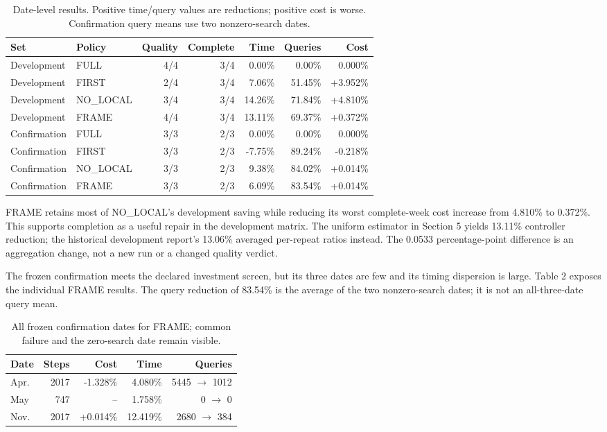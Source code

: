 \begin{table}[t]
\centering
\begin{tabular}{@{}llrrrrr@{}}
\toprule
Set & Policy & Quality & Complete & Time & Queries & Cost \\
\midrule
Development & FULL & 4/4 & 3/4 & 0.00\% & 0.00\% & 0.000\% \\
Development & FIRST & 2/4 & 3/4 & 7.06\% & 51.45\% & +3.952\% \\
Development & NO\_LOCAL & 3/4 & 3/4 & 14.26\% & 71.84\% & +4.810\% \\
Development & FRAME & 4/4 & 3/4 & 13.11\% & 69.37\% & +0.372\% \\
Confirmation & FULL & 3/3 & 2/3 & 0.00\% & 0.00\% & 0.000\% \\
Confirmation & FIRST & 3/3 & 2/3 & -7.75\% & 89.24\% & -0.218\% \\
Confirmation & NO\_LOCAL & 3/3 & 2/3 & 9.38\% & 84.02\% & +0.014\% \\
Confirmation & FRAME & 3/3 & 2/3 & 6.09\% & 83.54\% & +0.014\% \\
\bottomrule
\end{tabular}
\caption{Date-level results. Positive time/query values are reductions; positive cost is worse. Confirmation query means use two nonzero-search dates.}
\end{table}

FRAME retains most of NO\_LOCAL's development saving while reducing its worst complete-week cost increase from 4.810\% to 0.372\%. This supports completion as a useful repair in the development matrix. The uniform estimator in Section 5 yields 13.11\% controller reduction; the historical development report's 13.06\% averaged per-repeat ratios instead. The 0.0533 percentage-point difference is an aggregation change, not a new run or a changed quality verdict.


The frozen confirmation meets the declared investment screen, but its three dates are few and its timing dispersion is large. Table 2 exposes the individual FRAME results. The query reduction of 83.54\% is the average of the two nonzero-search dates; it is not an all-three-date query mean.


\begin{table}[t]
\centering
\begin{tabular}{@{}lrrrr@{}}
\toprule
Date & Steps & Cost & Time & Queries \\
\midrule
Apr. & 2017 & -1.328\% & 4.080\% & 5445 $\rightarrow$ 1012 \\
May & 747 & -- & 1.758\% & 0 $\rightarrow$ 0 \\
Nov. & 2017 & +0.014\% & 12.419\% & 2680 $\rightarrow$ 384 \\
\bottomrule
\end{tabular}
\caption{All frozen confirmation dates for FRAME; common failure and the zero-search date remain visible.}
\end{table}

